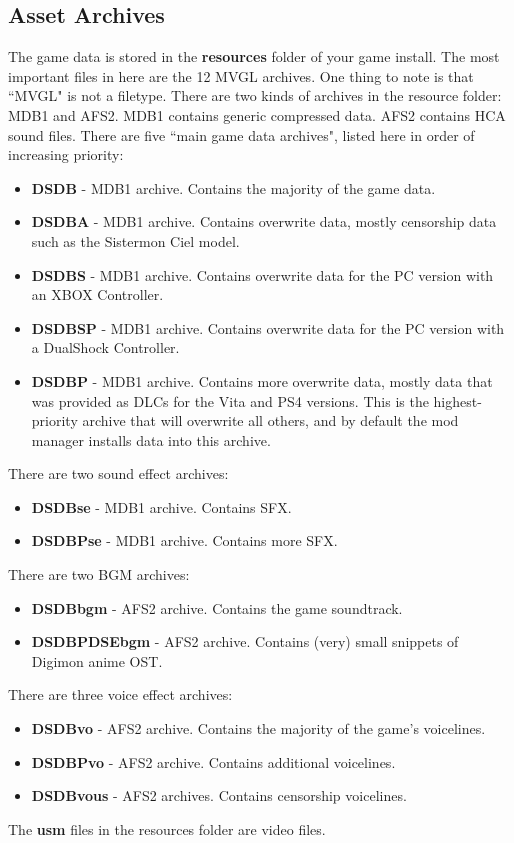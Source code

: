 \documentclass{article}
\begin{document}
\subsection{Asset Archives}
The game data is stored in the \textbf{resources} folder of your game install. The most important files in here are the 12 MVGL archives. One thing to note is that ``MVGL" is not a filetype. There are two kinds of archives in the resource folder: MDB1 and AFS2. MDB1 contains generic compressed data. AFS2 contains HCA sound files.
There are five ``main game data archives", listed here in order of increasing priority:
\begin{itemize}
\item \textbf{DSDB} - MDB1 archive. Contains the majority of the game data.
\item \textbf{DSDBA} - MDB1 archive. Contains overwrite data, mostly censorship data such as the Sistermon Ciel model.
\item \textbf{DSDBS} - MDB1 archive. Contains overwrite data for the PC version with an XBOX Controller.
\item \textbf{DSDBSP} - MDB1 archive. Contains overwrite data for the PC version with a DualShock Controller.
\item \textbf{DSDBP} - MDB1 archive. Contains more overwrite data, mostly data that was provided as DLCs for the Vita and PS4 versions. This is the highest-priority archive that will overwrite all others, and by default the mod manager installs data into this archive.
\end{itemize}
There are two sound effect archives:
\begin{itemize}
\item \textbf{DSDBse} - MDB1 archive. Contains SFX.
\item \textbf{DSDBPse} - MDB1 archive. Contains more SFX.
\end{itemize}
There are two BGM archives:
\begin{itemize}
\item \textbf{DSDBbgm} - AFS2 archive. Contains the game soundtrack.
\item \textbf{DSDBPDSEbgm} - AFS2 archive. Contains (very) small snippets of Digimon anime OST.
\end{itemize}
There are three voice effect archives:
\begin{itemize}
\item \textbf{DSDBvo} - AFS2 archive. Contains the majority of the game's voicelines.
\item \textbf{DSDBPvo} - AFS2 archive. Contains additional voicelines.
\item \textbf{DSDBvous} - AFS2 archives. Contains censorship voicelines.
\end{itemize}
The \textbf{usm} files in the resources folder are video files.
\end{document}
